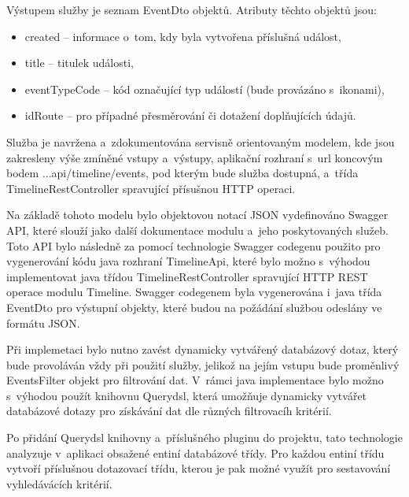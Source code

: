 \documentclass[12pt]{article}
\begin{document}
{Výstupem služby je seznam EventDto objektů.
Atributy těchto objektů jsou: 
\begin{itemize}
\item created -- informace o~tom, kdy byla vytvořena příslušná událost,
\item title -- titulek události,
\item eventTypeCode -- kód označující typ událostí (bude provázáno s~ikonami),
\item idRoute -- pro případné přesměrování či dotažení doplňujících údajů.
\end{itemize}


Služba je navržena a~zdokumentována servisně orientovaným modelem, kde jsou zakresleny výše zmíněné vstupy a~výstupy, 
aplikační rozhraní s~url koncovým bodem  ...api/timeline/events, pod kterým bude služba dostupná,
a~třída TimelineRestController spravující přísušnou HTTP operaci.

\clearpage

\obrazek
{}

\clearpage

Na základě tohoto modelu bylo objektovou notací JSON vydefinováno Swagger API,
které slouží jako další dokumentace modulu a~jeho poskytovaných služeb.
Toto API bylo následně za pomocí technologie Swagger codegenu 
použito pro vygenerování kódu java rozhraní TimelineApi, 
které bylo možno s~výhodou implementovat java třídou TimelineRestController
spravující HTTP REST operace modulu Timeline.
Swagger codegenem byla vygenerována i~java třída EventDto pro výstupní objekty,
které budou na požádání službou odeslány ve formátu JSON.

Při implemetaci bylo nutno zavést dynamicky vytvářený databázový dotaz,
který bude provoláván vždy při použití služby,
jelikož na jejím vstupu bude proměnlivý EventsFilter objekt pro filtrování dat.
V~rámci java implementace bylo možno s~výhodou použít knihovnu Querydsl,
která umožňuje dynamicky vytvářet databázové dotazy 
pro získávání dat dle různých filtrovacíh kritérií.

Po přidání Querydsl knihovny a~příslušného pluginu do projektu, 
tato technologie analyzuje v~aplikaci obsažené entiní databázové třídy.
Pro každou entiní třídu vytvoří příslušnou dotazovací třídu,
kterou je pak možné využít pro sestavování vyhledávácích kritérií.

}
\end{document}
